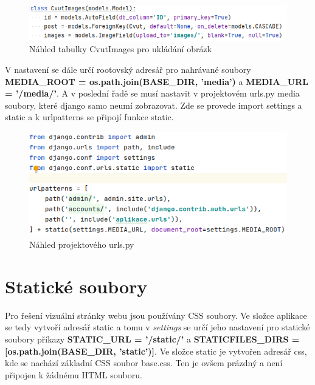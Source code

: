 \begin{figure}[H] \centering
    \includegraphics[width=430pt]{./pictures/9-db-cvutimages.PNG}
    \caption[Náhled tabulky CvutImages pro ukládání obrázků]{Náhled tabulky CvutImages pro ukládání obrázk}
	\label{fig:Náhled tabulky CvutImages pro ukládání obrázk}              
\end{figure}

V nastavení se dále určí rootovský adresář pro nahrávané soubory
\textbf{MEDIA\_ROOT = os.path.join(BASE\_DIR, 'media')} a
\textbf{MEDIA\_URL = '/media/'}.  A v poslední řadě se musí nastavit v
projektovém urls.py media soubory, které django samo neumí
zobrazovat. Zde se provede import settings a static a k urlpatterns se
připojí funkce static.

\begin{figure}[H] \centering
    \includegraphics[width=380pt]{./pictures/10-media-urlspy.PNG}
    \caption[Náhled projektového urls.py]{Náhled projektového urls.py}
	\label{fig:Náhled projektového urls.py}              
\end{figure}

\newpage

\section{Statické soubory}

Pro řešení vizuální stránky webu jsou používány CSS soubory. Ve složce
aplikace se tedy vytvoří adresář static a tomu v \emph{settings} se
určí jeho nastavení pro statické soubory příkazy \textbf{STATIC\_URL =
  '/static/'} a \textbf{STATICFILES\_DIRS = [os.path.join(BASE\_DIR,
  'static')]}. Ve složce static je vytvořen adresář css, kde se
nachází základní CSS soubor base.css. Ten je ovšem prázdný a není
připojen k žádnému HTML souboru.

